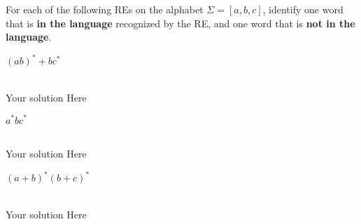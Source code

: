 \documentclass[12pt]{article}
\newenvironment{exercise}[2][Exercise]{\begin{trivlist}
\item[\hskip \labelsep {\bfseries #1}\hskip \labelsep {\bfseries #2.}]}{\end{trivlist}}
\newenvironment{solution}[1][{\color{red} Solution:}]{\begin{trivlist}
\item[\hskip \labelsep {\bfseries #1}\hskip \labelsep {\bfseries}]}{\end{trivlist}}
\begin{document}
 


\newcommand{\studentName}{YOUR NAME HERE} %

\newcommand{\collaborators}{
	with \textit{COLLABORATORS' NAMES HERE}
}

\begin{exercise}{1}
For each of the following REs on the alphabet $\Sigma = [a,b,c]$, identify one word that is \textbf{in the language} recognized by the RE, and one word that is \textbf{not in the language}.
\begin{enumerate}[(a)]
\item $(ab)^*+bc^*$
\begin{solution} 
\quad\\
Your solution Here
\end{solution}

\item $a^*bc^*$
\begin{solution}
\quad\\
Your solution Here
\end{solution}

\item $(a+b)^*(b+c)^*$
\begin{solution}
\quad\\
Your solution Here 
\end{solution}

\end{enumerate}
\end{exercise}

\clearpage
\end{document}
